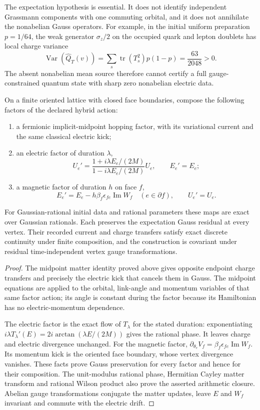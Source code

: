 The expectation hypothesis is essential. It does not identify independent
Grassmann components with one commuting orbital, and it does not annihilate
the nonabelian Gauss operators. For example, in the initial uniform
preparation $p=1/64$, the weak generator $\sigma_z/2$ on the occupied quark
and lepton doublets has local charge variance
\[
 \operatorname{Var}(\widehat Q_T(v))=
 \sum_s\operatorname{tr}(T_s^2)p(1-p)
 =\frac{63}{2048}>0.
\]
The absent nonabelian mean source therefore cannot certify a full
gauge-constrained quantum state with sharp zero nonabelian electric data.

\begin{proposition}
On a finite oriented lattice with closed face boundaries, compose the
following factors of the declared hybrid action:
\begin{enumerate}
\item a fermionic implicit-midpoint hopping factor, with its variational
      current and the same classical electric kick;
\item an electric factor of duration $\lambda$,
\[
 U_e'=
 \frac{1+i\lambda E_e/(2M)}{1-i\lambda E_e/(2M)}U_e,
 \qquad E_e'=E_e;
\]
\item a magnetic factor of duration $h$ on face $f$,
\[
 E_e'=E_e-h\beta_f\epsilon_{fe}\operatorname{Im}W_f
 \quad(e\in\partial f),\qquad U_e'=U_e.
\]
\end{enumerate}
For Gaussian-rational initial data and rational parameters these maps are
exact over Gaussian rationals. Each preserves the expectation Gauss residual
at every vertex. Their recorded current and charge transfers satisfy exact
discrete continuity under finite composition, and the construction is
covariant under residual time-independent vertex gauge transformations.
\end{proposition}

\begin{proof}
The midpoint matter identity proved above gives opposite endpoint charge
transfers and precisely the electric kick that cancels them in Gauss.
The midpoint equations are applied to the orbital, link-angle and momentum
variables of that same factor action; its angle is constant during the
factor because its Hamiltonian has no electric-momentum dependence.

The electric factor is the exact flow of $T_\lambda$ for the stated
duration: exponentiating
$i\lambda T_\lambda'(E)=2i\arctan(\lambda E/(2M))$
gives the rational phase. It leaves charge and electric divergence
unchanged. For the magnetic factor,
$\partial_{\theta_e}V_f=\beta_f\epsilon_{fe}\operatorname{Im}W_f$.
Its momentum kick is the oriented face boundary, whose vertex divergence
vanishes. These facts prove Gauss preservation for every factor and hence
for their composition. The unit-modulus rational phase, Hermitian Cayley
matter transform and rational Wilson product also prove the asserted
arithmetic closure. Abelian gauge transformations conjugate the matter
updates, leave $E$ and $W_f$ invariant and commute with the electric drift.
\end{proof}

